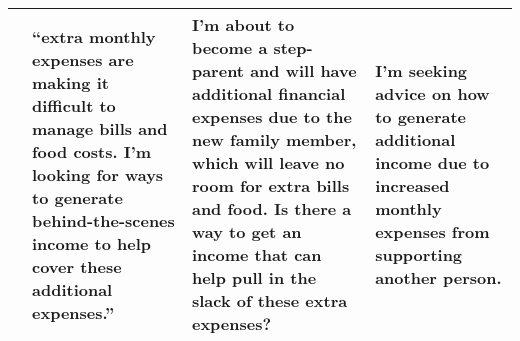 \begin{table*}[t]
{\begin{tabular}{p{} p{} p{} p{}}
    & ``extra monthly expenses are making it difficult to manage bills and food costs. I'm looking for ways to generate behind-the-scenes income to help cover these additional expenses.'' 
    & I'm about to become a step-parent and will have additional financial expenses due to the new family member, which will leave no room for extra bills and food. Is there a way to get an income that can help pull in the slack of these extra expenses?
    & I'm seeking advice on how to generate additional income due to increased monthly expenses from supporting another person. \\
    \bottomrule
  \end{tabular}%
  }
  \label{tab:dynamic_model_comparison}
\end{table*}
